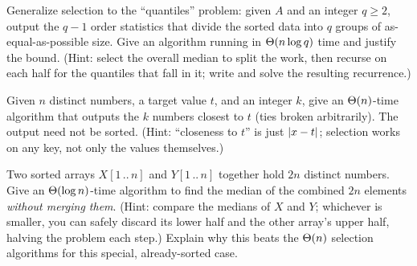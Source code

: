 \begin{exercise}\label{ch09:ex-quantile}
Generalize selection to the ``quantiles'' problem: given $A$ and an integer
$q \ge 2$, output the $q-1$ order statistics that divide the sorted data into $q$
groups of as-equal-as-possible size. Give an algorithm running in
$\Theta(n \log q)$ time and justify the bound. (Hint: select the overall median to
split the work, then recurse on each half for the quantiles that fall in it; write
and solve the resulting recurrence.)
\end{exercise}

\begin{exercise}\label{ch09:ex-kclosest}
Given $n$ distinct numbers, a target value $t$, and an integer $k$, give an
$\Theta(n)$-time algorithm that outputs the $k$ numbers closest to $t$ (ties broken
arbitrarily). The output need not be sorted. (Hint: ``closeness to $t$'' is just
$\lvert x - t\rvert$; selection works on any key, not only the values themselves.)
\end{exercise}

\begin{exercise}\label{ch09:ex-median-two-arrays}
Two sorted arrays $X[1\,..\,n]$ and $Y[1\,..\,n]$ together hold $2n$ distinct
numbers. Give an $\Theta(\log n)$-time algorithm to find the median of the combined
$2n$ elements \emph{without merging them}. (Hint: compare the medians of $X$ and
$Y$; whichever is smaller, you can safely discard its lower half and the other
array's upper half, halving the problem each step.) Explain why this beats the
$\Theta(n)$ selection algorithms for this special, already-sorted case.
\end{exercise}
